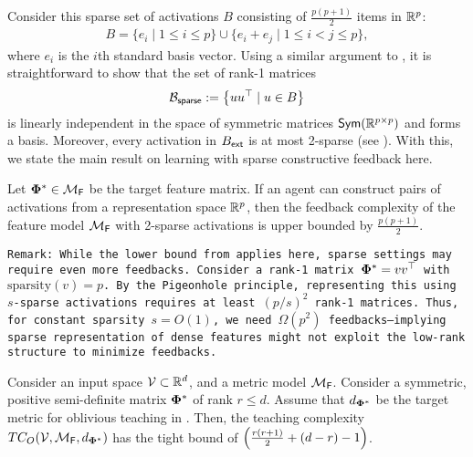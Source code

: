 Consider this sparse set of activations ${B}$ consisting of $\frac{p(p+1)}{2}$ items in $\reals^p$:
\begin{align}
  {B} = \{e_i \mid 1 \leq i \leq p\} \cup \{e_i + e_j \mid 1 \leq i < j \leq p\},  \label{eq: sparsebasis}
\end{align}
where $e_i$ is the $i$th standard basis vector. Using a similar argument to , it is straightforward to show that the set of rank-1 matrices
$$\cB_{\sf{sparse}} := \curlybracket{uu^\top \mid u \in {B}}$$
is linearly independent in the space of symmetric matrices $\symm$ and forms a basis. Moreover, every activation in $B_{\sf{ext}}$ is at most 2-sparse (see ). With this, we state the main result on learning with sparse constructive feedback here.

\begin{theorem}\label{thm: constructsparse}
    Let $\pphi^* \in \maha$ be the target feature matrix. 
    If an agent can construct pairs of activations from a representation space $\reals^p$, then the feedback complexity of the feature model $\maha$ with 2-sparse activations is upper bounded by $\frac{p(p+1)}{2}$.
\end{theorem}
\allowdisplaybreaks
\tt{Remark}: While the lower bound from  applies here, sparse settings may require even more feedbacks. Consider a rank-1 matrix $\pphi^* = vv^\top$ with $\text{sparsity}(v) = p$. By the Pigeonhole principle, representing this using $s$-sparse activations requires at least $(p/s)^2$ rank-1 matrices. Thus, for constant sparsity $s = O(1)$, we need $\Omega(p^2)$ feedbacks—implying sparse representation of dense features might not exploit the low-rank structure to minimize feedbacks. %
\iffalse
\begin{theorem}\label{thm: obv}
    Consider an input space $\cV \subset \reals^d$, and a metric model $\maha$.
    Consider a symmetric, positive semi-definite matrix $\pphi^*$ of rank $r \le d$. Assume that $d_{\pphi^*}$ be the target metric for oblivious teaching in . Then, the teaching complexity $TC_O(\cV, \maha, d_{\pphi^*})$ has the tight bound of $\paren{\frac{r(r+1)}{2} + (d - r) - 1}$.
\end{theorem}
